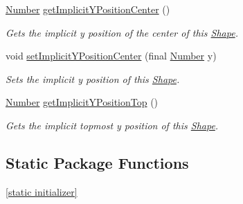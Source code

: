 \begin{DoxyCompactItemize}
\hyperlink{interfacecom_1_1aarrelaakso_1_1drawl_1_1_number}{Number} \hyperlink{classcom_1_1aarrelaakso_1_1drawl_1_1_shape_a1f27f0adc1716dc60691a7d0c14f2ace}{get\+Implicit\+Y\+Position\+Center} ()
\begin{DoxyCompactList}\small\item\em Gets the implicit y position of the center of this \hyperlink{classcom_1_1aarrelaakso_1_1drawl_1_1_shape}{Shape}. \end{DoxyCompactList}\item 
void \hyperlink{classcom_1_1aarrelaakso_1_1drawl_1_1_shape_a79c79420c626b8b2d2534b6c9aa64d8f}{set\+Implicit\+Y\+Position\+Center} (final \hyperlink{interfacecom_1_1aarrelaakso_1_1drawl_1_1_number}{Number} y)
\begin{DoxyCompactList}\small\item\em Sets the implicit y position of this \hyperlink{classcom_1_1aarrelaakso_1_1drawl_1_1_shape}{Shape}. \end{DoxyCompactList}\item 
\hyperlink{interfacecom_1_1aarrelaakso_1_1drawl_1_1_number}{Number} \hyperlink{classcom_1_1aarrelaakso_1_1drawl_1_1_shape_a6a52176302dd9b5d2bfc2d25409c310e}{get\+Implicit\+Y\+Position\+Top} ()
\begin{DoxyCompactList}\small\item\em Gets the implicit topmost y position of this \hyperlink{classcom_1_1aarrelaakso_1_1drawl_1_1_shape}{Shape}. \end{DoxyCompactList}\end{DoxyCompactItemize}
\subsection*{Static Package Functions}
\begin{DoxyCompactItemize}
\item 
\hyperlink{classcom_1_1aarrelaakso_1_1drawl_1_1_shape_ad2adcb85374cf5d6d59429628314e8d1}{\mbox{[}static initializer\mbox{]}}
\end{DoxyCompactItemize}

